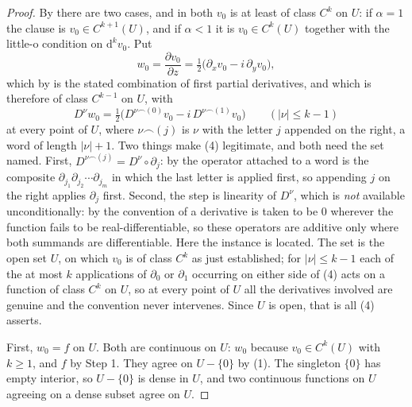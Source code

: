 \begin{proof}
By  there are two cases, and in both $v_0$ is at
least of class $C^{k}$ on $U$: if $\alpha=1$ the clause is
$v_0\in C^{k+1}(U)$, and if $\alpha<1$ it is $v_0\in C^{k}(U)$ together with
the little-o condition on $\mathrm{d}^{k}v_0$.  Put
\[
  w_0=\frac{\partial v_0}{\partial z}
  =\tfrac12\bigl(\partial_x v_0-i\,\partial_y v_0\bigr),
\]
which by  is the stated combination of first partial derivatives,
and which is therefore of class $C^{k-1}$ on $U$, with
\begin{equation}\tag{4}
  D^\nu w_0=\tfrac12\bigl(D^{\nu\frown(0)}v_0-i\,D^{\nu\frown(1)}v_0\bigr)
  \qquad(|\nu|\le k-1)
\end{equation}
at every point of $U$, where $\nu\frown(j)$ is $\nu$ with the letter $j$
appended on the right, a word of length $|\nu|+1$.  Two things make (4)
legitimate, and both need the set named.  First,
$D^{\nu\frown(j)}=D^{\nu}\circ\partial_j$: by  the
operator attached to a word is the composite
$\partial_{j_1}\partial_{j_2}\cdots\partial_{j_m}$ in which the last letter is
applied first, so appending $j$ on the right applies $\partial_j$ first.
Second, the step is linearity of $D^{\nu}$, which is \emph{not} available
unconditionally: by the convention of  a derivative is
taken to be $0$ wherever the function fails to be real-differentiable, so these
operators are additive only where both summands are differentiable.  Here the
instance is located.  The set is the open set $U$, on which $v_0$ is of class
$C^{k}$ as just established; for $|\nu|\le k-1$ each of the at most $k$
applications of $\partial_0$ or $\partial_1$ occurring on either side of (4)
acts on a function of class $C^{k}$ on $U$, so at every point of $U$ all the
derivatives involved are genuine and the convention never intervenes.  Since
$U$ is open, that is all (4) asserts.

First, $w_0=f$ on $U$.  Both are continuous on $U$: $w_0$ because
$v_0\in C^{k}(U)$ with $k\ge1$, and $f$ by Step 1.  They agree on $U-\{0\}$ by
(1).  The singleton $\{0\}$ has empty interior, so $U-\{0\}$ is dense in $U$,
and two continuous functions on $U$ agreeing on a dense subset agree on $U$.


\end{proof}
